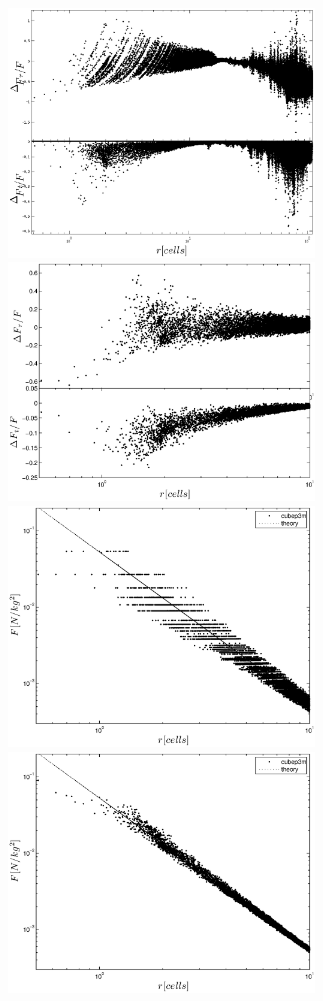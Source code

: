 \begin{figure}%
  \begin{center}
    \includegraphics[width=3.2in]{graphs/densityForce_fracErr_N1.eps}
    \includegraphics[width=3.2in]{graphs/densityForce_fracErr_N10.eps}
    \includegraphics[width=3.2in]{graphs/densityForce_Zoom_N1.eps}
    \includegraphics[width=3.2in]{graphs/densityForce_Zoom_N10.eps}

\end{center}
\end{figure}

